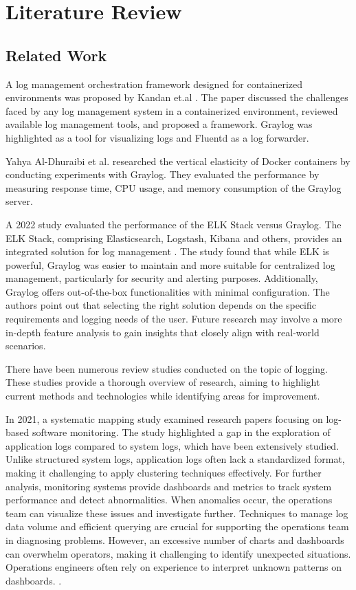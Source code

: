 \documentclass[../main.tex]{subfiles}
\begin{document}
\chapter{Literature Review}

\section{Related Work}

A log management orchestration framework designed for containerized environments was proposed by Kandan et.al \cite{clof}. The paper discussed the challenges faced by any log management system in a containerized environment, reviewed available log management tools, and proposed a framework. Graylog was highlighted as a tool for visualizing logs and Fluentd as a log forwarder.

Yahya Al-Dhuraibi et al. \cite{verticalelasticity} researched the vertical elasticity of Docker containers by conducting experiments with Graylog. They evaluated the performance by measuring response time, CPU usage, and memory consumption of the Graylog server.

A 2022 study evaluated the performance of the ELK Stack versus Graylog. The ELK Stack, comprising Elasticsearch, Logstash, Kibana and others, provides an integrated solution for log management \cite{elk}. The study found that while ELK is powerful, Graylog was easier to maintain and more suitable for centralized log management, particularly for security and alerting purposes. Additionally, Graylog offers out-of-the-box functionalities with minimal configuration. The authors point out that selecting the right solution depends on the specific requirements and logging needs of the user. Future research may involve a more in-depth feature analysis to gain insights that closely align with real-world scenarios. \cite{elkvsgraylog}

There have been numerous review studies conducted on the topic of logging. These studies provide a thorough overview of research, aiming to highlight current methods and technologies while identifying areas for improvement.

In 2021, a systematic mapping study \cite{bib3} examined research papers focusing on log-based software monitoring. The study highlighted a gap in the exploration of application logs compared to system logs, which have been extensively studied. Unlike structured system logs, application logs often lack a standardized format, making it challenging to apply clustering techniques effectively. For further analysis, monitoring systems provide dashboards and metrics to track system performance and detect abnormalities. When anomalies occur, the operations team can visualize these issues and investigate further. Techniques to manage log data volume and efficient querying are crucial for supporting the operations team in diagnosing problems. However, an excessive number of charts and dashboards can overwhelm operators, making it challenging to identify unexpected situations. Operations engineers often rely on experience to interpret unknown patterns on dashboards. \cite{logbasedmonitoring}.
\end{document}

